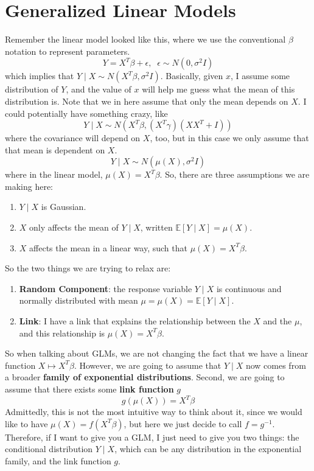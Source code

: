 \section{Generalized Linear Models} 

  Remember the linear model looked like this, where we use the conventional $\beta$ notation to represent parameters. 
  \begin{equation}
    Y = X^T \beta + \epsilon, \;\; \epsilon \sim N(0, \sigma^2 I)
  \end{equation}
  which implies that $Y \mid X \sim N(X^T \beta, \sigma^2 I)$. Basically, given $x$, I assume some distribution of $Y$, and the value of $x$ will help me guess what the mean of this distribution is. Note that we in here assume that only the mean depends on $X$. I could potentially have something crazy, like 
  \[Y \mid X \sim N(X^T \beta, (X^T \gamma) (X X^T + I))\]
  where the covariance will depend on $X$, too, but in this case we only assume that that mean is dependent on $X$. 
  \[Y \mid X \sim N(\mu(X), \sigma^2 I)\]
  where in the linear model, $\mu(X) = X^T \beta$. So, there are three assumptions we are making here: 
  \begin{enumerate}
    \item $Y \mid X$ is Gaussian. 
    \item $X$ only affects the mean of $Y \mid X$, written $\mathbb{E}[Y \mid X] = \mu(X)$. 
    \item $X$ affects the mean in a linear way, such that $\mu(X) = X^T \beta$. 
  \end{enumerate}
  So the two things we are trying to relax are: 
  \begin{enumerate}
    \item \textbf{Random Component}: the response variable $Y \mid X$ is continuous and normally distributed with mean $\mu = \mu(X) = \mathbb{E}[Y \mid X]$. 
    \item \textbf{Link}: I have a link that explains the relationship between the $X$ and the $\mu$, and this relationship is $\mu(X) = X^T \beta$. 
  \end{enumerate}
  So when talking about GLMs, we are not changing the fact that we have a linear function $X \mapsto X^T \beta$. However, we are going to assume that $Y \mid X$ now comes from a broader \textbf{family of exponential distributions}. Second, we are going to assume that there exists some \textbf{link function} $g$
  \[g(\mu(X)) = X^T \beta\]
  Admittedly, this is not the most intuitive way to think about it, since we would like to have $\mu(X) = f(X^T \beta)$, but here we just decide to call $f = g^{-1}$. Therefore, if I want to give you a GLM, I just need to give you two things: the conditional distribution $Y \mid X$, which can be any distribution in the exponential family, and the link function $g$. 

